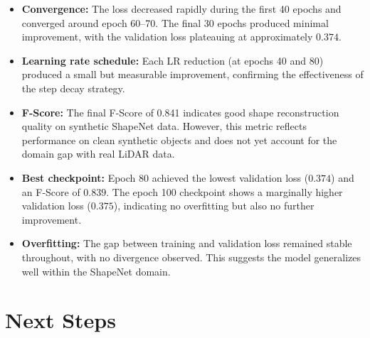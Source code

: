 \documentclass[a4paper, 12pt]{article}
\begin{document}
\begin{itemize}[nosep]
    \item \textbf{Convergence:} The loss decreased rapidly during the first 40 epochs and converged around epoch 60--70. The final 30 epochs produced minimal improvement, with the validation loss plateauing at approximately $0.374$.
    \item \textbf{Learning rate schedule:} Each LR reduction (at epochs 40 and 80) produced a small but measurable improvement, confirming the effectiveness of the step decay strategy.
    \item \textbf{F-Score:} The final F-Score of 0.841 indicates good shape reconstruction quality on synthetic ShapeNet data. However, this metric reflects performance on clean synthetic objects and does not yet account for the domain gap with real LiDAR data.
    \item \textbf{Best checkpoint:} Epoch 80 achieved the lowest validation loss ($0.374$) and an F-Score of $0.839$. The epoch 100 checkpoint shows a marginally higher validation loss ($0.375$), indicating no overfitting but also no further improvement.
    \item \textbf{Overfitting:} The gap between training and validation loss remained stable throughout, with no divergence observed. This suggests the model generalizes well within the ShapeNet domain.
\end{itemize}

\section{Next Steps}
\end{document}

